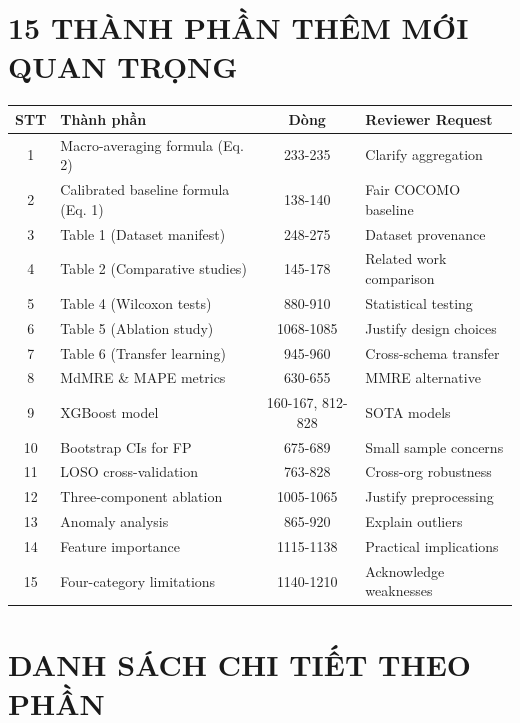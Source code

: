 \documentclass[11pt,a4paper]{article}
\begin{document}
\section{15 THÀNH PHẦN THÊM MỚI QUAN TRỌNG}

\begin{center}
\begin{tabular}{|c|p{}|c|p{}|}
\hline
\textbf{STT} & \textbf{Thành phần} & \textbf{Dòng} & \textbf{Reviewer Request} \\
\hline
1 & Macro-averaging formula (Eq. 2) & 233-235 & Clarify aggregation \\
\hline
2 & Calibrated baseline formula (Eq. 1) & 138-140 & Fair COCOMO baseline \\
\hline
3 & Table 1 (Dataset manifest) & 248-275 & Dataset provenance \\
\hline
4 & Table 2 (Comparative studies) & 145-178 & Related work comparison \\
\hline
5 & Table 4 (Wilcoxon tests) & 880-910 & Statistical testing \\
\hline
6 & Table 5 (Ablation study) & 1068-1085 & Justify design choices \\
\hline
7 & Table 6 (Transfer learning) & 945-960 & Cross-schema transfer \\
\hline
8 & MdMRE \& MAPE metrics & 630-655 & MMRE alternative \\
\hline
9 & XGBoost model & 160-167, 812-828 & SOTA models \\
\hline
10 & Bootstrap CIs for FP & 675-689 & Small sample concerns \\
\hline
11 & LOSO cross-validation & 763-828 & Cross-org robustness \\
\hline
12 & Three-component ablation & 1005-1065 & Justify preprocessing \\
\hline
13 & Anomaly analysis & 865-920 & Explain outliers \\
\hline
14 & Feature importance & 1115-1138 & Practical implications \\
\hline
15 & Four-category limitations & 1140-1210 & Acknowledge weaknesses \\
\hline
\end{tabular}
\end{center}

\newpage

\section{DANH SÁCH CHI TIẾT THEO PHẦN}
\end{document}
